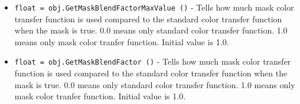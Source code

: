 \begin{itemize}
\item  \verb|float = obj.GetMaskBlendFactorMaxValue ()| -  Tells how much mask color transfer function is used compared to the
 standard color transfer function when the mask is true.
 0.0 means only standard color transfer function.
 1.0 means only mask color tranfer function.
 Initial value is 1.0.

\item  \verb|float = obj.GetMaskBlendFactor ()| -  Tells how much mask color transfer function is used compared to the
 standard color transfer function when the mask is true.
 0.0 means only standard color transfer function.
 1.0 means only mask color tranfer function.
 Initial value is 1.0.

\end{itemize}
